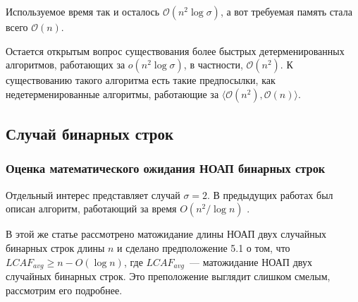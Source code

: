 Используемое время так и осталось $\mathcal{O}(n^2 \log \sigma)$, а вот требуемая память стала всего $\mathcal{O}(n)$.

Остается открытым вопрос существования более быстрых детерменированных алгоритмов, работающих за $o(n^2 \log \sigma)$, в частности, $\mathcal{O}(n^2)$. К существованию такого алгоритма есть такие предпосылки, как недетерменированные алгоритмы, работающие за $\langle \mathcal{O}(n^2), \mathcal{O}(n) \rangle$.

\subsection{Случай бинарных строк}

\subsubsection{Оценка математического ожидания НОАП бинарных строк}
Отдельный интерес представляет случай $\sigma=2$. В предыдущих работах был описан алгоритм, работающий за время $O(n^2/\log n)$ \cite{1}.

В этой же статье рассмотрено матожидание длины НОАП двух случайных бинарных строк длины $n$ и сделано предположение 5.1 \cite{1} о том, что $LCAF_{avg} \ge n - O(\log n)$, где $LCAF_{avg}$~--- матожидание НОАП двух случайных бинарных строк. Это преположение выглядит слишком смелым, рассмотрим его подробнее.


